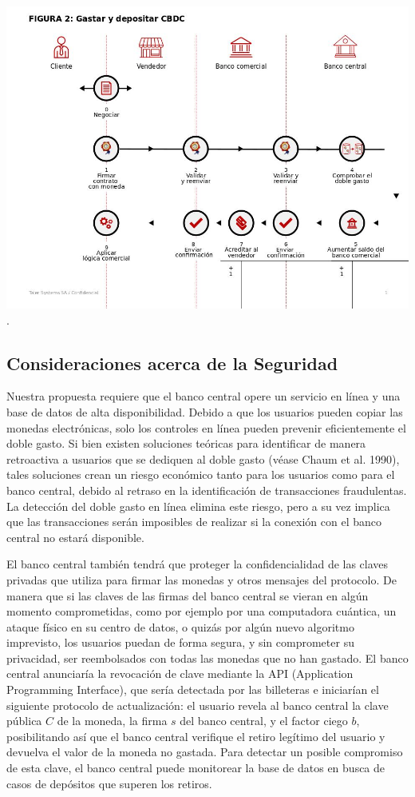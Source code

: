 \documentclass[10pt,spanish]{article}
\begin{document}
\includegraphics[width=\textwidth]{taler_figure_2_dora_SPANISH.jpg}.

\hypertarget{consideraciones-acerca-de-la-seguridad}{%
\subsection{Consideraciones acerca de la Seguridad}
\label{consideraciones-acerca-de-la-seguridad}}

Nuestra propuesta requiere que el banco central opere un servicio en
línea y una base de datos de alta disponibilidad. Debido a que los
usuarios pueden copiar las monedas electrónicas, solo los controles en
línea pueden prevenir eficientemente el doble gasto. Si bien existen
soluciones teóricas para identificar de manera retroactiva a usuarios
que se dediquen al doble gasto (véase Chaum et al. 1990), tales
soluciones crean un riesgo económico tanto para los usuarios como para
el banco central, debido al retraso en la identificación de
transacciones fraudulentas. La detección del doble gasto en línea
elimina este riesgo, pero a su vez implica que las transacciones serán
imposibles de realizar si la conexión con el banco central no estará
disponible.

El banco central también tendrá que proteger la confidencialidad de las
claves privadas que utiliza para firmar las monedas y otros mensajes del
protocolo. De manera que si las claves de las firmas del banco central
se vieran en algún momento comprometidas, como por ejemplo por una
computadora cuántica, un ataque físico en su centro de datos, o quizás
por algún nuevo algoritmo imprevisto, los usuarios puedan de forma
segura, y sin comprometer su privacidad, ser reembolsados con todas las
monedas que no han gastado. El banco central anunciaría la revocación de
clave mediante la API (Application Programming Interface), que sería
detectada por las billeteras e iniciarían el siguiente protocolo de
actualización: el usuario revela al banco central la clave pública
$C$ de la moneda, la firma $s$ del banco central, y el factor
ciego $b$, posibilitando así que el banco central verifique el
retiro legítimo del usuario y devuelva el valor de la moneda no gastada.
Para detectar un posible compromiso de esta clave, el banco central
puede monitorear la base de datos en busca de casos de depósitos que
superen los retiros.
\end{document}
